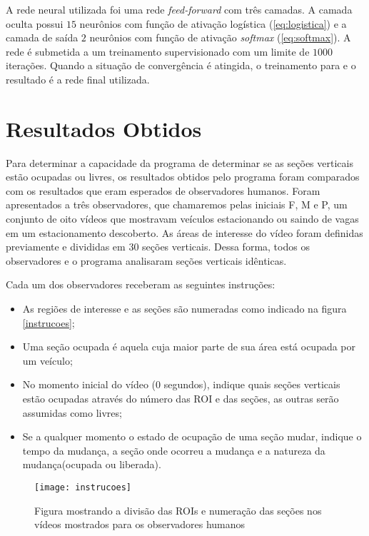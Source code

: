 A rede neural utilizada foi uma rede \textit{feed-forward} com três camadas. A camada oculta possui $15$ neurônios com função de ativação logística (\ref{eq:logistica}) e a camada de saída $2$ neurônios com função de ativação \textit{softmax} (\ref{eq:softmax}). A rede é submetida a um treinamento supervisionado com um limite de $1000$ iterações. Quando a situação de convergência é atingida, o treinamento para e o resultado é a rede final utilizada.


\section{Resultados Obtidos}

Para determinar a capacidade da programa de determinar se as seções verticais estão ocupadas ou livres, os resultados obtidos pelo programa foram comparados com os resultados que eram esperados de observadores humanos. Foram apresentados a três observadores, que chamaremos pelas iniciais F, M e P, um conjunto de oito vídeos que mostravam veículos estacionando ou saindo de vagas em um estacionamento descoberto. As áreas de interesse do vídeo foram definidas previamente e divididas em $30$ seções verticais. Dessa forma, todos os observadores e o programa analisaram seções verticais idênticas. 

Cada um dos observadores receberam as seguintes instruções:

\begin{itemize}
  \item As regiões de interesse e as seções são numeradas como indicado na figura \ref{instrucoes};
	\item Uma seção ocupada é aquela cuja maior parte de sua área está ocupada por um veículo;
	\item No momento inicial do vídeo ($0$ segundos), indique quais seções verticais estão ocupadas através do número das ROI e das seções, as outras serão assumidas como livres;
	\item Se a qualquer momento o estado de ocupação de uma seção mudar, indique o tempo da mudança, a seção onde ocorreu a mudança e a natureza da mudança(ocupada ou liberada).
\end{itemize}

\begin{figure}
\centering
\texttt{[image: instrucoes]}
\centering
\caption{Figura mostrando a divisão das ROIs e numeração das seções nos vídeos mostrados para os observadores humanos}
\label{fig:instrucao}
\end{figure}


